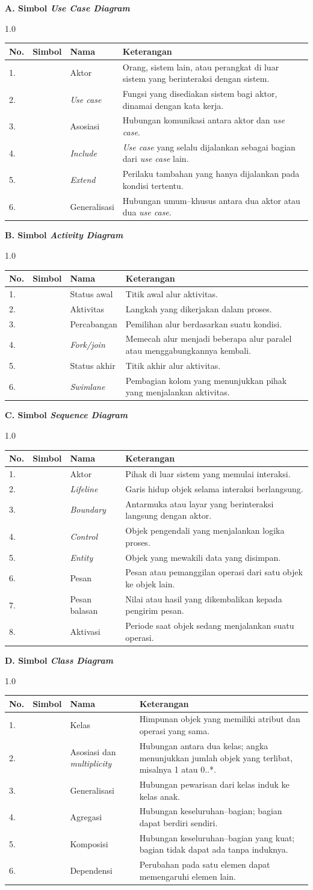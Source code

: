\documentclass[12pt,a4paper,twoside]{report}
\newcommand{\symactor}{\begin{tikzpicture}[sym,scale=0.55]
  \draw (0,0.9) circle (0.2); \draw (0,0.7)--(0,0.1); \draw (-0.3,0.55)--(0.3,0.55);
  \draw (0,0.1)--(-0.25,-0.35); \draw (0,0.1)--(0.25,-0.35);\end{tikzpicture}}
\newcommand{\symusecase}{\begin{tikzpicture}[sym]
  \draw (0,0) ellipse (0.9 and 0.4); \node[lbl] at (0,0) {Use Case};\end{tikzpicture}}
\newcommand{\symassoc}{\begin{tikzpicture}[sym]\draw (0,0)--(1.8,0);\end{tikzpicture}}
\newcommand{\symrel}[1]{\begin{tikzpicture}[sym]
  \draw[dashed,-{Stealth[open,length=4pt,width=4pt]}] (0,0)--(1.8,0);
  \node[lbl] at (0.9,0.22) {#1};\end{tikzpicture}}
\newcommand{\symgen}{\begin{tikzpicture}[sym]
  \draw[-{Triangle[open,length=5pt,width=5pt]}] (0,0)--(1.8,0);\end{tikzpicture}}
\newcommand{\syminitial}{\begin{tikzpicture}[sym]\fill (0,0) circle (0.14);\end{tikzpicture}}
\newcommand{\symactivity}{\begin{tikzpicture}[sym]
  \draw[rounded corners=4pt] (-0.6,-0.3) rectangle (0.6,0.3); \node[lbl] at (0,0) {Aktivitas};\end{tikzpicture}}
\newcommand{\symdecision}{\begin{tikzpicture}[sym]
  \draw (0,0.33)--(0.33,0)--(0,-0.33)--(-0.33,0)--cycle;\end{tikzpicture}}
\newcommand{\symfork}{\begin{tikzpicture}[sym]
  \draw (0,0.45)--(0,0.06); \draw[line width=2.2pt] (-0.7,0)--(0.7,0);
  \draw (-0.4,-0.06)--(-0.4,-0.4); \draw (0.4,-0.06)--(0.4,-0.4);\end{tikzpicture}}
\newcommand{\symfinal}{\begin{tikzpicture}[sym]
  \draw (0,0) circle (0.2); \fill (0,0) circle (0.12);\end{tikzpicture}}
\newcommand{\symswimlane}{\begin{tikzpicture}[sym]
  \draw (-0.8,-0.5) rectangle (0.8,0.5); \draw (0,-0.5)--(0,0.5); \draw (-0.8,0.3)--(0.8,0.3);
  \node[lbl] at (-0.4,0.4) {Aktor A}; \node[lbl] at (0.4,0.4) {Aktor B};\end{tikzpicture}}
\newcommand{\symlifeline}{\begin{tikzpicture}[sym]
  \draw (-0.4,0.1) rectangle (0.4,0.45); \node[lbl] at (0,0.275) {Objek};
  \draw[dashed] (0,0.1)--(0,-0.5);\end{tikzpicture}}
\newcommand{\symboundary}{\begin{tikzpicture}[sym]
  \draw (0.1,0) circle (0.28); \draw (-0.18,0)--(-0.18,0) ; \draw (-0.45,0)--(-0.18,0);
  \draw (-0.45,-0.25)--(-0.45,0.25);\end{tikzpicture}}
\newcommand{\symcontrol}{\begin{tikzpicture}[sym]
  \draw (0,0) circle (0.28);
  \draw[-{Stealth[length=3pt,width=3pt]}] (0.1,0.28)--(-0.05,0.28);\end{tikzpicture}}
\newcommand{\symentity}{\begin{tikzpicture}[sym]
  \draw (0,0) circle (0.28); \draw (-0.28,-0.38)--(0.28,-0.38);\end{tikzpicture}}
\newcommand{\symmessage}{\begin{tikzpicture}[sym]
  \draw[-{Stealth[length=4pt,width=4pt]}] (0,0)--(1.8,0); \node[lbl] at (0.9,0.2) {pesan()};\end{tikzpicture}}
\newcommand{\symreturn}{\begin{tikzpicture}[sym]
  \draw[dashed,-{Stealth[length=4pt,width=4pt]}] (1.8,0)--(0,0); \node[lbl] at (0.9,0.2) {balasan};\end{tikzpicture}}
\newcommand{\symactivation}{\begin{tikzpicture}[sym]
  \draw[dashed] (0,0.5)--(0,-0.5); \filldraw[fill=white] (-0.07,-0.3) rectangle (0.07,0.3);\end{tikzpicture}}
\newcommand{\symclass}{\begin{tikzpicture}[sym]
  \draw (-0.85,-0.45) rectangle (0.85,0.45); \draw (-0.85,0.2)--(0.85,0.2); \draw (-0.85,-0.12)--(0.85,-0.12);
  \node[lbl] at (0,0.33) {\bfseries NamaKelas};
  \node[lbl,anchor=west] at (-0.8,0.04) {- atribut : Tipe};
  \node[lbl,anchor=west] at (-0.8,-0.28) {+ operasi() : Tipe};\end{tikzpicture}}
\newcommand{\symassocmult}{\begin{tikzpicture}[sym]
  \draw (0,0)--(1.8,0); \node[lbl] at (0.12,0.15) {1}; \node[lbl] at (1.65,0.15) {0..*};\end{tikzpicture}}
\newcommand{\symaggr}{\begin{tikzpicture}[sym]
  \draw (0.3,0)--(1.8,0); \draw (0,0)--(0.15,0.1)--(0.3,0)--(0.15,-0.1)--cycle;\end{tikzpicture}}
\newcommand{\symcomp}{\begin{tikzpicture}[sym]
  \draw (0.3,0)--(1.8,0); \filldraw (0,0)--(0.15,0.1)--(0.3,0)--(0.15,-0.1)--cycle;\end{tikzpicture}}
\newcommand{\symdep}{\begin{tikzpicture}[sym]
  \draw[dashed,-{Stealth[open,length=4pt,width=4pt]}] (0,0)--(1.8,0);\end{tikzpicture}}
\newcommand{\simbolkel}[1]{\par\nopagebreak\noindent\textbf{#1}\par\nopagebreak\vspace{4pt}}
\newenvironment{tabsimbol}{%
  \renewcommand{\arraystretch}{1.0}\setlength{\extrarowheight}{3pt}\setlength{\tabcolsep}{4pt}\begin{spacing}{1.0}\noindent
  \begin{tabular}{|>{\centering\arraybackslash}m{0.9cm}|>{\centering\arraybackslash}m{3.0cm}|>{\raggedright\arraybackslash}m{2.9cm}|>{\raggedright\arraybackslash}m{5.9cm}|}\hline
  \textbf{No.} & \textbf{Simbol} & \centering\textbf{Nama} & \centering\arraybackslash\textbf{Keterangan}\\ \hline}%
  {\end{tabular}\end{spacing}}
\newcommand{\brs}[4]{\rule[-0.55cm]{0pt}{1.1cm}#1. & #2 & #3 & #4\\ \hline}
\begin{document}
\simbolkel{A. Simbol \textit{Use Case Diagram}}
\begin{tabsimbol}
\brs{1}{\symactor}{Aktor}{Orang, sistem lain, atau perangkat di luar sistem yang berinteraksi dengan sistem.}
\brs{2}{\symusecase}{\textit{Use case}}{Fungsi yang disediakan sistem bagi aktor, dinamai dengan kata kerja.}
\brs{3}{\symassoc}{Asosiasi}{Hubungan komunikasi antara aktor dan \textit{use case}.}
\brs{4}{\symrel{\guillemotleft include\guillemotright}}{\textit{Include}}{\textit{Use case} yang selalu dijalankan sebagai bagian dari \textit{use case} lain.}
\brs{5}{\symrel{\guillemotleft extend\guillemotright}}{\textit{Extend}}{Perilaku tambahan yang hanya dijalankan pada kondisi tertentu.}
\brs{6}{\symgen}{Generalisasi}{Hubungan umum--khusus antara dua aktor atau dua \textit{use case}.}
\end{tabsimbol}

\simbolkel{B. Simbol \textit{Activity Diagram}}
\begin{tabsimbol}
\brs{1}{\syminitial}{Status awal}{Titik awal alur aktivitas.}
\brs{2}{\symactivity}{Aktivitas}{Langkah yang dikerjakan dalam proses.}
\brs{3}{\symdecision}{Percabangan}{Pemilihan alur berdasarkan suatu kondisi.}
\brs{4}{\symfork}{\textit{Fork/join}}{Memecah alur menjadi beberapa alur paralel atau menggabungkannya kembali.}
\brs{5}{\symfinal}{Status akhir}{Titik akhir alur aktivitas.}
\brs{6}{\symswimlane}{\textit{Swimlane}}{Pembagian kolom yang menunjukkan pihak yang menjalankan aktivitas.}
\end{tabsimbol}

\simbolkel{C. Simbol \textit{Sequence Diagram}}
\begin{tabsimbol}
\brs{1}{\symactor}{Aktor}{Pihak di luar sistem yang memulai interaksi.}
\brs{2}{\symlifeline}{\textit{Lifeline}}{Garis hidup objek selama interaksi berlangsung.}
\brs{3}{\symboundary}{\textit{Boundary}}{Antarmuka atau layar yang berinteraksi langsung dengan aktor.}
\brs{4}{\symcontrol}{\textit{Control}}{Objek pengendali yang menjalankan logika proses.}
\brs{5}{\symentity}{\textit{Entity}}{Objek yang mewakili data yang disimpan.}
\brs{6}{\symmessage}{Pesan}{Pesan atau pemanggilan operasi dari satu objek ke objek lain.}
\brs{7}{\symreturn}{Pesan balasan}{Nilai atau hasil yang dikembalikan kepada pengirim pesan.}
\brs{8}{\symactivation}{Aktivasi}{Periode saat objek sedang menjalankan suatu operasi.}
\end{tabsimbol}

\clearpage
\simbolkel{D. Simbol \textit{Class Diagram}}
\begin{tabsimbol}
\brs{1}{\symclass}{Kelas}{Himpunan objek yang memiliki atribut dan operasi yang sama.}
\brs{2}{\symassocmult}{Asosiasi dan \textit{multiplicity}}{Hubungan antara dua kelas; angka menunjukkan jumlah objek yang terlibat, misalnya 1 atau 0..*.}
\brs{3}{\symgen}{Generalisasi}{Hubungan pewarisan dari kelas induk ke kelas anak.}
\brs{4}{\symaggr}{Agregasi}{Hubungan keseluruhan--bagian; bagian dapat berdiri sendiri.}
\brs{5}{\symcomp}{Komposisi}{Hubungan keseluruhan--bagian yang kuat; bagian tidak dapat ada tanpa induknya.}
\brs{6}{\symdep}{Dependensi}{Perubahan pada satu elemen dapat memengaruhi elemen lain.}
\end{tabsimbol}
\clearpage
\end{document}
